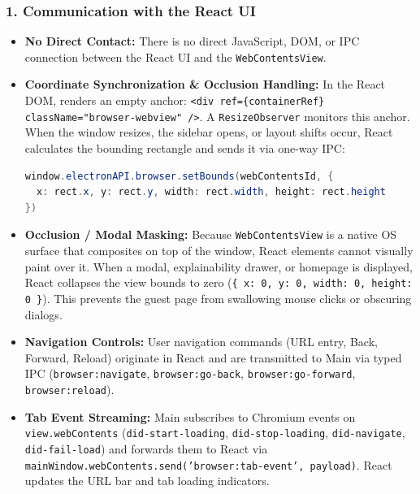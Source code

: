 \documentclass[11pt,a4paper]{article}
\newcommand{\pth}[1]{\texttt{\seqsplit{#1}}}
\begin{document}
\subsubsection{1. Communication with the React UI}
\begin{itemize}[leftmargin=1.4em]
\item \textbf{No Direct Contact:} There is no direct JavaScript, DOM, or IPC connection between the React UI and the \texttt{WebContentsView}.
\item \textbf{Coordinate Synchronization \& Occlusion Handling:} In the React DOM, \pth{BrowserWebView.tsx} renders an empty anchor: \texttt{<div ref=\{containerRef\} className="browser-webview" />}. A \texttt{ResizeObserver} monitors this anchor. When the window resizes, the sidebar opens, or layout shifts occur, React calculates the bounding rectangle and sends it via one-way IPC:
\begin{lstlisting}[language=java]
window.electronAPI.browser.setBounds(webContentsId, {
  x: rect.x, y: rect.y, width: rect.width, height: rect.height
})
\end{lstlisting}
\item \textbf{Occlusion / Modal Masking:} Because \texttt{WebContentsView} is a native OS surface that composites on top of the window, React elements cannot visually paint over it. When a modal, explainability drawer, or homepage is displayed, React collapses the view bounds to zero (\texttt{\{ x: 0, y: 0, width: 0, height: 0 \}}). This prevents the guest page from swallowing mouse clicks or obscuring dialogs.
\item \textbf{Navigation Controls:} User navigation commands (URL entry, Back, Forward, Reload) originate in React and are transmitted to Main via typed IPC (\texttt{browser:navigate}, \texttt{browser:go-back}, \texttt{browser:go-forward}, \texttt{browser:reload}).
\item \textbf{Tab Event Streaming:} Main subscribes to Chromium events on \texttt{view.webContents} (\texttt{did-start-loading}, \texttt{did-stop-loading}, \texttt{did-navigate}, \texttt{did-fail-load}) and forwards them to React via \texttt{mainWindow.webContents.send('browser:tab-event', payload)}. React updates the URL bar and tab loading indicators.
\end{itemize}
\end{document}
